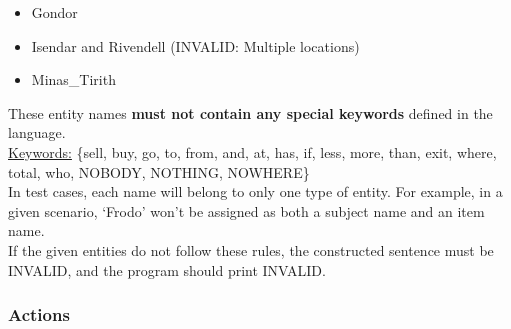 \documentclass[12pt]{article}
\begin{document}
\begin{itemize}
\begin{itemize}
    \item Gondor
    \item Isendar and Rivendell (INVALID: Multiple locations)
    \item Minas\_Tirith

\end{itemize}

\end{itemize}

\noindent These entity names \textbf{must not contain any special keywords} defined in the language. \\ 

\noindent \underline{Keywords:} \{sell, buy, go, to, from, and, at, has, if, less, more, than, exit, where, total, who, NOBODY, NOTHING, NOWHERE\} \\

\noindent In test cases, each name will belong to only one type of entity. For example, in a given scenario, `Frodo' won't be assigned as both a subject name and an item name. \\

\noindent If the given entities do not follow these rules, the constructed sentence must be INVALID, and the program should print INVALID.

\subsubsection{Actions}
\end{document}
